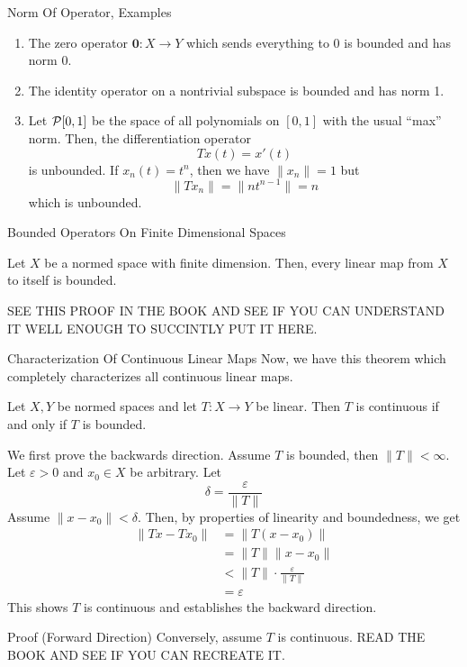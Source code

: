 \documentclass[10pt]{beamer}
\begin{document}
		\begin{frame}{Norm Of Operator, Examples}
				\begin{enumerate}
						\item<1-> The zero operator $\mathbf{0} : X\to Y$ which sends everything to 0 is bounded and has norm 0. 
						\item<2-> The identity operator on a nontrivial subspace is bounded and has norm 1. 
						\item<3-> Let $\mathcal{P}[0, 1]$ be the space of all polynomials on $[0, 1]$ with the usual ``max'' norm. Then, the differentiation operator 
								\begin{equation*}
										Tx(t) = x'(t)
								\end{equation*}
								is unbounded. If $x_n(t) = t^n$, then we have $\|x_n\| = 1$ but 
								\begin{equation*}
										\|Tx_n\| = \|nt^{n-1}\| = n
								\end{equation*}
								which is unbounded.
				\end{enumerate}
		\end{frame}

		\begin{frame}{Bounded Operators On Finite Dimensional Spaces}
				\begin{theorem}[]
						Let $X$ be a normed space with finite dimension. Then, every linear map from $X$ to itself is bounded. 
				\end{theorem}
				\begin{myproof}
						SEE THIS PROOF IN THE BOOK AND SEE IF YOU CAN UNDERSTAND IT WELL ENOUGH TO SUCCINTLY PUT IT HERE.
				\end{myproof}
		\end{frame}

		\begin{frame}{Characterization Of Continuous Linear Maps}
				\small
				Now, we have this theorem which completely characterizes all continuous linear maps. 
				\begin{theorem}[]
						Let $X,Y$ be normed spaces and let $T: X\to Y$ be linear. Then $T$ is continuous if and only if $T$ is bounded.
				\end{theorem}
				We first prove the backwards direction. Assume $T$ is bounded, then $\|T\| < \infty$. Let $\varepsilon > 0$ and $x_0\in X$ be arbitrary. Let 
				\begin{equation*}
						\delta = \frac{\varepsilon}{\|T\|}
				\end{equation*}
				Assume $\|x - x_0\| < \delta$. Then, by properties of linearity and boundedness, we get 
				\begin{align*}
						\|Tx - Tx_0\| &= \|T(x - x_0)\| \\ 
													&= \|T\|\|x - x_0\| \\ 
													&< \|T\| \cdot \frac{\varepsilon}{\|T\|} \\ 
													&= \varepsilon
				\end{align*}
				This shows $T$ is continuous and establishes the backward direction.
		\end{frame}

		\begin{frame}{Proof (Forward Direction)}
				Conversely, assume $T$ is continuous. READ THE BOOK AND SEE IF YOU CAN RECREATE IT.
		\end{frame}
\end{document}

